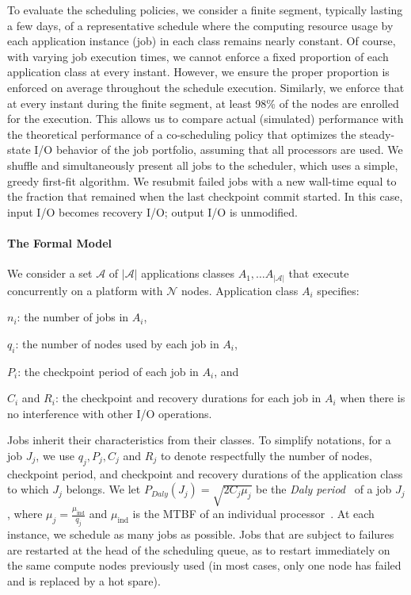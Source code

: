 \documentclass[two]{article}
\newcommand{\muind}{\mu_{\text{ind}}}
\newcommand{\appset}{{\mathcal A}}
\newcommand{\nbnodesplat}{{\mathcal N}}
\newcommand{\nbapps}{|{\mathcal A}|}
\newcommand{\app}[1]{A_{#1}}
\newcommand{\nbapp}[1]{n_{#1}}
\newcommand{\nbnodes}[1]{q_{#1}}
\newcommand{\period}[1]{P_{#1}}
\newcommand{\ckpt}[1]{C_{#1}}
\newcommand{\reco}[1]{R_{#1}}
\begin{document}
To evaluate the scheduling policies, we consider a finite segment, typically
lasting a few days, of a representative schedule where the computing resource
usage by each application instance (job) in each class remains nearly constant.
Of course, with varying job execution times, we cannot enforce a fixed
proportion of each application class at every instant. However, we ensure the
proper proportion is enforced on average throughout the schedule execution.
Similarly, we enforce that at every instant during the finite segment, at least
98\% of the nodes are enrolled for the execution. This allows us to compare
actual (simulated) performance with the theoretical performance of a
co-scheduling policy that optimizes the steady-state I/O behavior of the job
portfolio, assuming that all processors are used. We shuffle and simultaneously
present all jobs to the scheduler, which uses a simple, greedy first-fit
algorithm.  We resubmit failed jobs with a new wall-time equal to the fraction
that remained when the last checkpoint commit started.  In this case, input I/O
becomes recovery I/O; output I/O is unmodified.

\paragraph*{The Formal Model}

We consider a set $\appset$ of $\nbapps$ applications classes
$\app{1}, \ldots \app{\nbapps}$ that execute concurrently on a platform with
$\nbnodesplat$ nodes. Application class $\app{i}$ specifies:
\begin{compactitem}
\item $\nbapp{i}$: the number of jobs in $\app{i}$,
\item $\nbnodes{i}$: the number of nodes used by each job in $\app{i}$,
\item $\period{i}$: the checkpoint period of each job in $\app{i}$, and
\item $\ckpt{i}$ and $\reco{i}$: the checkpoint and recovery durations for each job in $\app{i}$ when there is no interference with other I/O operations.
\end{compactitem}

Jobs inherit their characteristics from their classes. To simplify notations, 
for a job $J_j$, we use $\nbnodes{j}, \period{j}, \ckpt{j}$ and
$\reco{j}$ to denote respectfully the number of nodes, checkpoint
period, and checkpoint and recovery durations of the application class
to which $J_j$ belongs.  We let
$\period{Daly}(J_{j}) = \sqrt{2 \ckpt{j} \mu_{j}}$ be the \emph{Daly
  period}~\cite{young74,daly04} of a job $J_j$, where
$\mu_{j} = \frac{\muind}{\nbnodes{j}}$ and $\muind$ is the MTBF of an
individual processor~\cite{springer-monograph}.  At each instance, we
schedule as many jobs as possible.  Jobs that are subject to failures
are restarted at the head of the scheduling queue, as to restart
immediately on the same compute nodes previously used (in most cases,
only one node has failed and is replaced by a hot spare).
\end{document}
